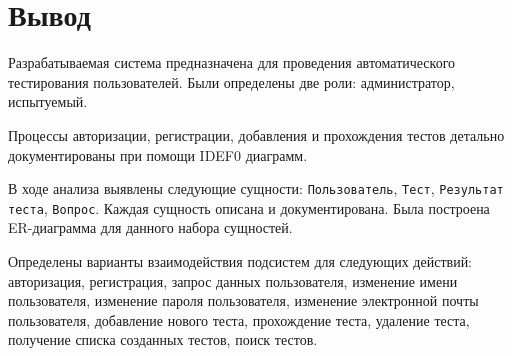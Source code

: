 \begin{figure}[ht!]
\end{figure}
\begin{figure}[ht!]
\end{figure}

\clearpage
\section{Вывод}
Разрабатываемая система предназначена для проведения автоматического тестирования пользователей. Были определены две роли: администратор, испытуемый. 

Процессы авторизации, регистрации, добавления и прохождения тестов детально документированы при помощи IDEF0 диаграмм.

В ходе анализа выявлены следующие сущности: \texttt{Пользователь}, \texttt{Тест}, \texttt{Результат теста}, \texttt{Вопрос}. Каждая сущность описана и документирована. Была построена ER-диаграмма для данного набора сущностей.   

Определены варианты взаимодействия подсистем для следующих действий: авторизация, регистрация, запрос данных пользователя, изменение имени пользователя, изменение пароля пользователя, изменение электронной почты пользователя, добавление нового теста, прохождение теста, удаление теста, получение списка созданных тестов, поиск тестов.

